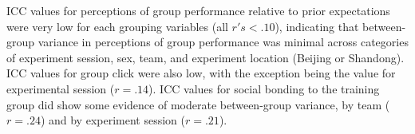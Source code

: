 


ICC values for perceptions of group performance relative to prior expectations were very low for each grouping variables (all $r's < .10$), indicating that between-group variance in perceptions of group performance was minimal across categories of experiment session, sex, team, and experiment location (Beijing or Shandong).  ICC values for group click were also low, with the exception being the value for experimental session ($r = .14$).  ICC values for social bonding to the training group did show some evidence of moderate between-group variance, by team ($r = .24$) and by experiment session ($r = .21$).








